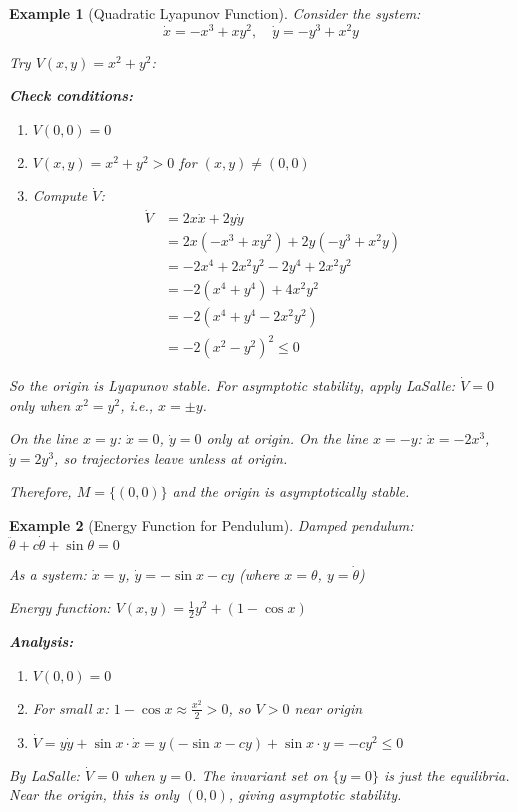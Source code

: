 \documentclass[12pt]{article}
\newtheorem{example}{Example}
\begin{document}
\begin{example}[Quadratic Lyapunov Function]
Consider the system:
$$\dot{x} = -x^3 + xy^2, \quad \dot{y} = -y^3 + x^2y$$

Try $V(x,y) = x^2 + y^2$:

\textbf{Check conditions:}
\begin{enumerate}
    \item $V(0,0) = 0$ \checkmark
    \item $V(x,y) = x^2 + y^2 > 0$ for $(x,y) \neq (0,0)$ \checkmark
    \item Compute $\dot{V}$:
    \begin{align}
    \dot{V} &= 2x\dot{x} + 2y\dot{y}\\
    &= 2x(-x^3 + xy^2) + 2y(-y^3 + x^2y)\\
    &= -2x^4 + 2x^2y^2 - 2y^4 + 2x^2y^2\\
    &= -2(x^4 + y^4) + 4x^2y^2\\
    &= -2(x^4 + y^4 - 2x^2y^2)\\
    &= -2(x^2 - y^2)^2 \leq 0
    \end{align}
\end{enumerate}

So the origin is Lyapunov stable. For asymptotic stability, apply LaSalle:
$\dot{V} = 0$ only when $x^2 = y^2$, i.e., $x = \pm y$.

On the line $x = y$: $\dot{x} = 0$, $\dot{y} = 0$ only at origin.
On the line $x = -y$: $\dot{x} = -2x^3$, $\dot{y} = 2y^3$, so trajectories leave unless at origin.

Therefore, $M = \{(0,0)\}$ and the origin is asymptotically stable.
\end{example}

\begin{example}[Energy Function for Pendulum]
Damped pendulum: $\ddot{\theta} + c\dot{\theta} + \sin\theta = 0$

As a system: $\dot{x} = y$, $\dot{y} = -\sin x - cy$ (where $x = \theta$, $y = \dot{\theta}$)

Energy function: $V(x,y) = \frac{1}{2}y^2 + (1 - \cos x)$

\textbf{Analysis:}
\begin{enumerate}
    \item $V(0,0) = 0$ \checkmark
    \item For small $x$: $1 - \cos x \approx \frac{x^2}{2} > 0$, so $V > 0$ near origin \checkmark
    \item $\dot{V} = y\dot{y} + \sin x \cdot \dot{x} = y(-\sin x - cy) + \sin x \cdot y = -cy^2 \leq 0$
\end{enumerate}

By LaSalle: $\dot{V} = 0$ when $y = 0$. The invariant set on $\{y = 0\}$ is just the equilibria. Near the origin, this is only $(0,0)$, giving asymptotic stability.
\end{example}
\end{document}

